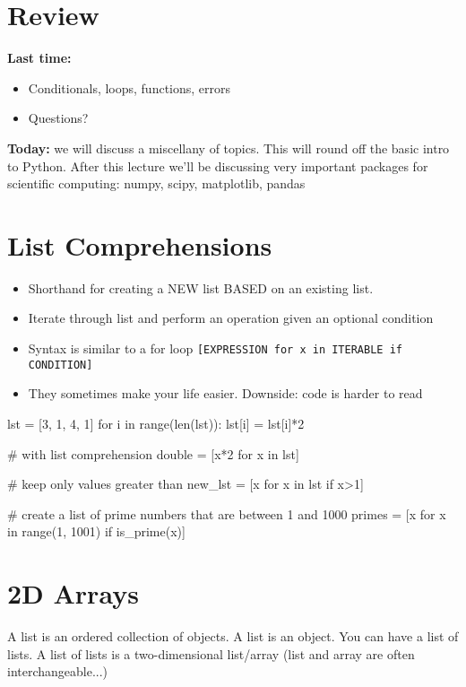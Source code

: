 \documentclass[12pt]{article}
\numberwithin{equation}{section}
\begin{document}
\section{Review}

\textbf{Last time:}
\begin{itemize}
    \item Conditionals, loops, functions, errors
    \item Questions?
\end{itemize}

\textbf{Today:} we will discuss a miscellany of topics. This will round off the basic intro to Python. After this lecture we'll be discussing very important packages for scientific computing: numpy, scipy, matplotlib, pandas

\section{List Comprehensions}
\begin{itemize}
    \item Shorthand for creating a NEW list BASED on an existing list.
    \item Iterate through list and perform an operation given an optional condition
    \item Syntax is similar to a for loop
    \verb|[EXPRESSION for x in ITERABLE if CONDITION]|
    \item They sometimes make your life easier. Downside: code is harder to read
\end{itemize}

\begin{python}
lst = [3, 1, 4, 1]
for i in range(len(lst)):
    lst[i] = lst[i]*2

# with list comprehension
double = [x*2 for x in lst]

# keep only values greater than 
new_lst = [x for x in lst if x>1]

# create a list of prime numbers that are between 1 and 1000
primes = [x for x in range(1, 1001) if is_prime(x)]
\end{python}

\section{2D Arrays}
A list is an ordered collection of objects. A list is an object. You can have a list of lists. A list of lists is a two-dimensional list/array (list and array are often interchangeable...)
\end{document}
